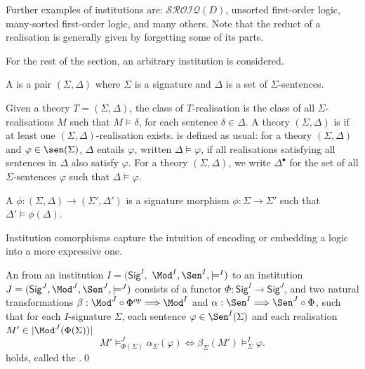 \documentclass[10pt, a4paper]{isov2}
\newcommand{\Sig}{\mathsf{Sig}}
\begin{document}
Further examples of institutions are: $\mathcal{SROIQ}(D)$, unsorted first-order logic, 
many-sorted first-order logic, and many others.  Note that the reduct of a realisation 
is generally given by forgetting some of its parts.

For the rest of the section, an arbitrary institution is considered. 

\begin{definition}[Theory]
A  is a pair $(\Sigma,\Delta)$ where $\Sigma$ is a signature and $\Delta$ is a set of $\Sigma$-sentences.
\end{definition}

Given a theory $T=(\Sigma, \Delta)$, the class of $T$-realisation 
is the class of all
$\Sigma$-realisations $M$ such that $M\models \delta$, 
for each sentence $\delta \in \Delta$.
A theory $(\Sigma, \Delta)$ is  if at least one 
 $(\Sigma, \Delta)$-realisation exists. 
  is defined as usual: 
for  a theory $(\Sigma, \Delta)$ and 
$\varphi\in \sen(\Sigma)$, $\Delta$ entails $\varphi$, written $\Delta\models\varphi$, if all realisations satisfying all sentences in
$\Delta$ also satisfy $\varphi$. For a theory $(\Sigma, \Delta)$, we write $\Delta^\bullet$ for the set of all $\Sigma$-sentences $\varphi$ such that $\Delta \models \varphi$. 

\begin{definition}
A  $\phi: (\Sigma, \Delta) \rightarrow (\Sigma',  \Delta')$ is 
   a signature morphism $\phi:\Sigma\rightarrow \Sigma'$ such that $\Delta'\models \phi(\Delta)$.
\end{definition}
\medskip

Institution comorphisms capture the intuition of encoding or embedding a logic into a more expressive one.

\begin{definition} An  from an institution $I = (\Sig^I,$ $ \Mod^I, \Sen^I, \models^I)$ to an institution $J=(\Sig^J, \Mod^J,\Sen^J, \models^J)$ consists of a functor $\Phi : \Sig^I \longrightarrow \Sig^J$, and
two natural transformations $\beta: \Mod^J \circ \Phi^{op} \Longrightarrow \Mod^I$
and $\alpha: \Sen^I \Longrightarrow \Sen^J \circ \Phi$, such that 
for each $I$-signature $\Sigma$, each sentence $\varphi\in\Sen^I(\Sigma)$ and each realisation $M'\in|\Mod^J(\Phi(\Sigma))|$
%
\begin{equation*}
  M'\models^{J}_{\Phi(\Sigma)}\alpha_{\Sigma}(\varphi)
\iff
  \beta_{\Sigma}(M')\models^I_{\Sigma}\varphi.
\end{equation*}
%
holds, called the .\quad\qed
\end{definition}
\end{document}
